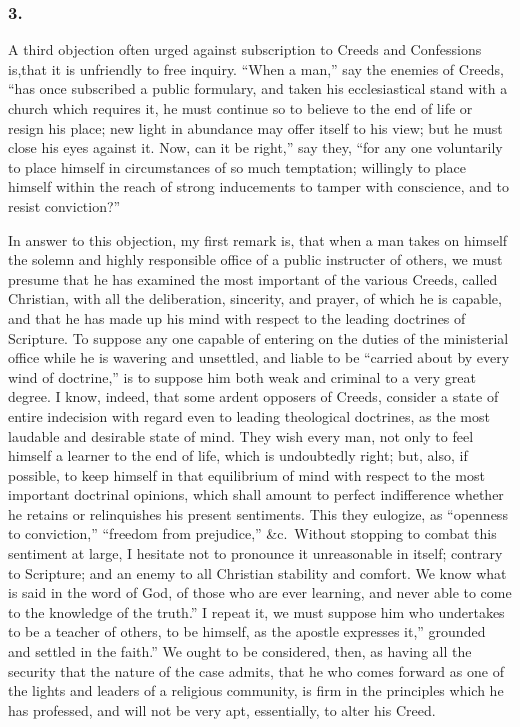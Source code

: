 \documentclass[
]{book}
\begin{document}
\hypertarget{section-9}{%
\subsubsection*{3.}\label{section-9}}

A third objection often urged against subscription to Creeds and Confessions is,that it is unfriendly to free inquiry. ``When a man,'' say the enemies of Creeds, ``has once subscribed a public formulary, and taken his ecclesiastical stand with a church which requires it, he must continue so to believe to the end of life or resign his place; new light in abundance may offer itself to his view; but he must close his eyes against it. Now, can it be right,'' say they, ``for any one voluntarily to place himself in circumstances of so much temptation; willingly to place himself within the reach of strong inducements to tamper with conscience, and to resist conviction?''

In answer to this objection, my first remark is, that when a man takes on himself the solemn and highly responsible office of a public instructer of others, we must presume that he has examined the most important of the various Creeds, called Christian, with all the deliberation, sincerity, and prayer, of which he is capable, and that he has made up his mind with respect to the leading doctrines of Scripture. To suppose any one capable of entering on the duties of the ministerial office while he is wavering and unsettled, and liable to be ``carried about by every wind of doctrine,'' is to suppose him both weak and criminal to a very great degree. I know, indeed, that some ardent opposers of Creeds, consider a state of entire indecision with regard even to leading theological doctrines, as the most laudable and desirable state of mind. They wish every man, not only to feel himself a learner to the end of life, which is undoubtedly right; but, also, if possible, to keep himself in that equilibrium of mind with respect to the most important doctrinal opinions, which shall amount to perfect indifference whether he retains or relinquishes his present sentiments. This they eulogize, as ``openness to conviction,'' ``freedom from prejudice,'' \&c.~Without stopping to combat this sentiment at large, I hesitate not to pronounce it unreasonable in itself; contrary to Scripture; and an enemy to all Christian stability and comfort. We know what is said in the word of God, of those who are ever learning, and never able to come to the knowledge of the truth.'' I repeat it, we must suppose him who undertakes to be a teacher of others, to be himself, as the apostle expresses it,'' grounded and settled in the faith.'' We ought to be considered, then, as having all the security that the nature of the case admits, that he who comes forward as one of the lights and leaders of a religious community, is firm in the principles which he has professed, and will not be very apt, essentially, to alter his Creed.
\end{document}
